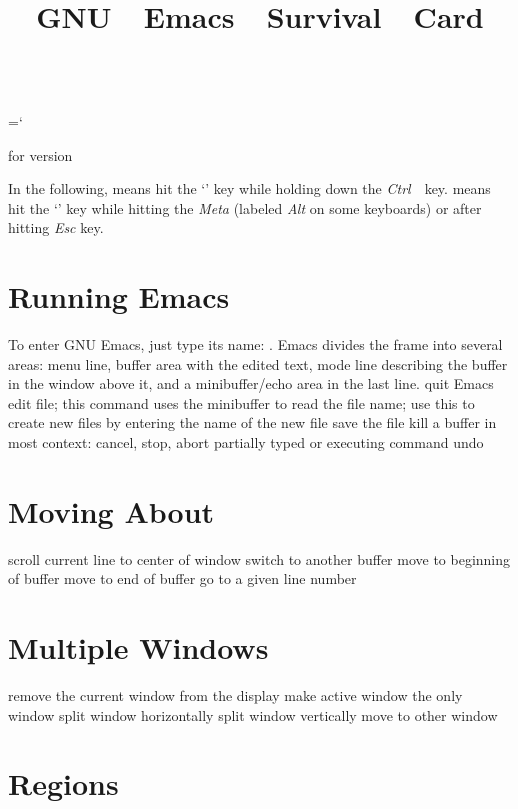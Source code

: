 \chardef\\=`\\

\raggedright
\nopagenumbers
\parindent 0pt
\hoffset -0.2in



\title{GNU\ \ Emacs\ \ Survival\ \ Card}{for version \versionemacs}

In the following,  means hit the `' key while
holding down the {\it Ctrl}\ \ key.  means hit the
`' key while hitting the {\it Meta\/} (labeled {\it Alt\/}
on some keyboards) or after hitting {\it Esc\/} key.

\section{Running Emacs}

To enter GNU Emacs, just type its name: .
Emacs divides the frame into several areas:
  menu line,
  buffer area with the edited text,
  mode line describing the buffer in the window above it,
  and a minibuffer/echo area in the last line.
\askip
{} quit Emacs
 edit file; this command uses the minibuffer to read
  the file name; use this to create new files by entering the name
  of the new file
 save the file
 kill a buffer
 in most context: cancel, stop, abort partially typed or
  executing command
 undo

\section{Moving About}

 scroll current line to center of window
 switch to another buffer
 move to beginning of buffer
 move to end of buffer
 go to a given line number

\section{Multiple Windows}

 remove the current window from the display
 make active window the only window
 split window horizontally
 split window vertically
 move to other window

\section{Regions}

